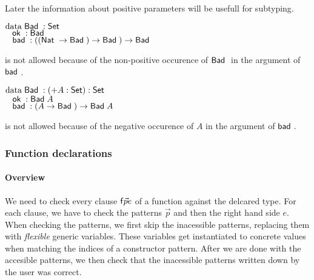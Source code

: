 Later the information about positive parameters will be usefull for subtyping.

\begin{bsp}
$\mathrm{data}\; \mathsf{Bad}\; : \mathsf{Set} $ \\
$\hspace*{3mm} \mathsf{ok}\; : \mathsf{Bad}\;$\\
$\hspace*{3mm} \mathsf{bad}\; : ((\mathsf{Nat}\; \rightarrow \mathsf{Bad}\;) \rightarrow \mathsf{Bad}\;) \rightarrow \mathsf{Bad}\;  $
\end{bsp}
is not allowed because of the non-positive occurence of $\mathsf{Bad}\;$ in the argument of $\mathsf{bad}\;$.

\begin{bsp}
$\mathrm{data}\; \mathsf{Bad}\; : ( + A : \mathsf{Set} ) : \mathsf{Set} $\\
$\hspace*{3mm} \mathsf{ok}\; : \mathsf{Bad}\; A$\\
$\hspace*{3mm} \mathsf{bad}\; : (A \rightarrow \mathsf{Bad}\;) \rightarrow \mathsf{Bad}\; A$
\end{bsp}
is not allowed because of the negative occurence of $A$ in the argument of $\mathsf{bad}\;$.

\subsubsection{Function declarations}

\newcommand\checkcl[2]{#1\mbox{ \textbf{checkcl}}#2}
\newcommand\checkp[5]{(#1)\vdash#2\mbox{ \textbf{checkp} }#3\Rightarrow (#4),#5}
\newcommand\checkps[5]{(#1)\vdash#2\mbox{ \textbf{checkps} }#3\Rightarrow (#4),#5}
\newcommand\checkinacc[2]{(#1)\vdash\mbox{ \textbf{checkinaccs} }#2}
\newcommand\inst[5]{#1,#2\vdash#3\mbox{ \textbf{inst} }#4\Rightarrow #5}
\newcommand\instlist[5]{#1,#2\vdash#3\mbox{ \textbf{instList} }#4\Rightarrow #5}


\paragraph*{Overview}
We need to check every clause $\mathsf{f} \vec{p} e$ of a function against the delcared type.
For each clause, we have to check the patterns $\vec{p}$ and then the right hand side $e$.
When checking the patterns, we first skip the inacessible patterns, 
replacing them with \emph{flexible} generic variables.
These variables get instantiated to concrete values when matching
the indices of a constructor pattern.
After we are done with the accesible patterns, 
we then check that the inacessible patterns written down 
by the user was correct.
\newcommand{\subst}[2]{#1\{#2\}}
\newcommand{\substClos}[2]{#1\{#2\}}
\newcommand{\substEnv}[2]{#1\{#2\}}
\newcommand{\compS}[2]{\mathrm{compS}#1\;#2}


\newcommand\ptc{\mathrm{p2c}}
\newcommand\inaccenv{\mathrm{inaccEnv}}
\newcommand\pte{\mathrm{p2e}}
\newcommand\pstes{\mathrm{ps2es}}


